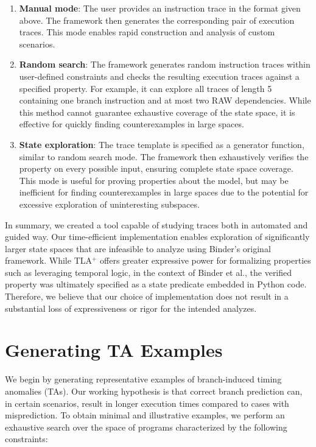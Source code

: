 \begin{enumerate}
	\item \textbf{Manual mode}: The user provides an instruction trace in the format given above. The framework then generates the corresponding pair of execution traces. This mode enables rapid construction and analysis of custom scenarios.
	\item \textbf{Random search}: The framework generates random instruction traces within user-defined constraints and checks the resulting execution traces against a specified property. For example, it can explore all traces of length 5 containing one branch instruction and at most two RAW dependencies. While this method cannot guarantee exhaustive coverage of the state space, it is effective for quickly finding counterexamples in large spaces.
	\item \textbf{State exploration}: The trace template is specified as a generator function, similar to random search mode. The framework then exhaustively verifies the property on every possible input, ensuring complete state space coverage. This mode is useful for proving properties about the model, but may be inefficient for finding counterexamples in large spaces due to the potential for excessive exploration of uninteresting subspaces.
\end{enumerate}


In summary, we created a tool capable of studying traces both in automated and guided way. Our time-efficient implementation enables exploration of significantly larger state spaces that are infeasible to analyze using Binder's original framework. While TLA$^+$ offers greater expressive power for formalizing properties such as leveraging temporal logic, in the context of Binder et al., the verified property was ultimately specified as a state predicate embedded in Python code. Therefore, we believe that our choice of implementation does not result in a substantial loss of expressiveness or rigor for the intended analyzes.

\section{Generating TA Examples}

We begin by generating representative examples of branch-induced timing anomalies (TAs). Our working hypothesis is that correct branch prediction can, in certain scenarios, result in longer execution times compared to cases with misprediction. To obtain minimal and illustrative examples, we perform an exhaustive search over the space of programs characterized by the following constraints:

